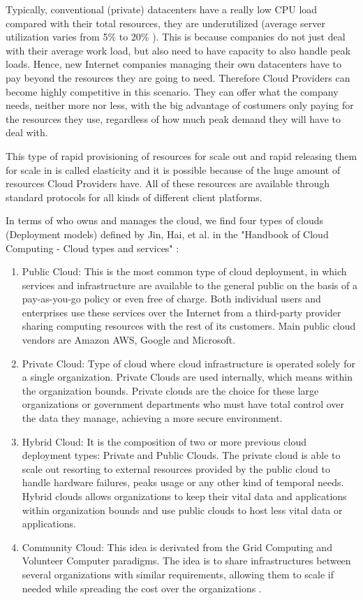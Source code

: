 \bigskip

Typically, conventional (private) datacenters have a really low CPU load compared with their total resources, they are underutilized (average server utilization varies from 5\% to 20\% \cite{lynch2008cloud}). This is because companies do not just deal with their average work load, but also need to have capacity to also handle peak loads. Hence, new Internet companies managing their own datacenters have to pay beyond the resources they are going to need. Therefore Cloud Providers can become highly competitive in this scenario. They can offer what the company needs, neither more nor less, with the big advantage of costumers only paying for the resources they use, regardless of how much peak demand they will have to deal with.
\par
This type of rapid provisioning of resources for scale out and rapid releasing them for scale in is called elasticity and it is possible because of the huge amount of resources Cloud Providers have. 
All of these resources are available through standard protocols for all kinds of different client platforms.
 \par
In terms of who owns and manages the cloud, we find four types of clouds (Deployment models) defined by Jin, Hai, et al. in the "Handbook of Cloud Computing - Cloud types and services" \cite{jin2010cloud}:
\begin{enumerate}
\item Public Cloud: 
This is the most common type of cloud deployment, in which services and infrastructure are available to the general public on the basis of a pay-as-you-go policy or even free of charge. Both individual users and enterprises use these services over the Internet from a third-party provider sharing computing resources with the rest of its customers. Main public cloud vendors are Amazon AWS, Google and Microsoft.

\item Private Cloud:
Type of cloud where cloud infrastructure is operated solely for a single organization. Private Clouds are used internally, which means within the organization bounds. Private clouds are the choice for these large organizations or government departments who must have total control over the data they manage, achieving a more secure environment. 

\item Hybrid Cloud:
It is the composition of two or more previous cloud deployment types: Private and Public Clouds. The private cloud is able to scale out resorting to external resources provided by the public cloud to handle hardware failures, peaks usage or any other kind of temporal needs. Hybrid clouds allows organizations to keep their vital data and applications within organization bounds and use public clouds to host less vital data or applications.

\item Community Cloud:
This idea is derivated from the Grid Computing and Volunteer Computer paradigms. The idea is to share infrastructures between several organizations with similar requirements, allowing them to scale if needed while spreading the cost over the organizations \cite{wiki:cloud}.
\end{enumerate}


